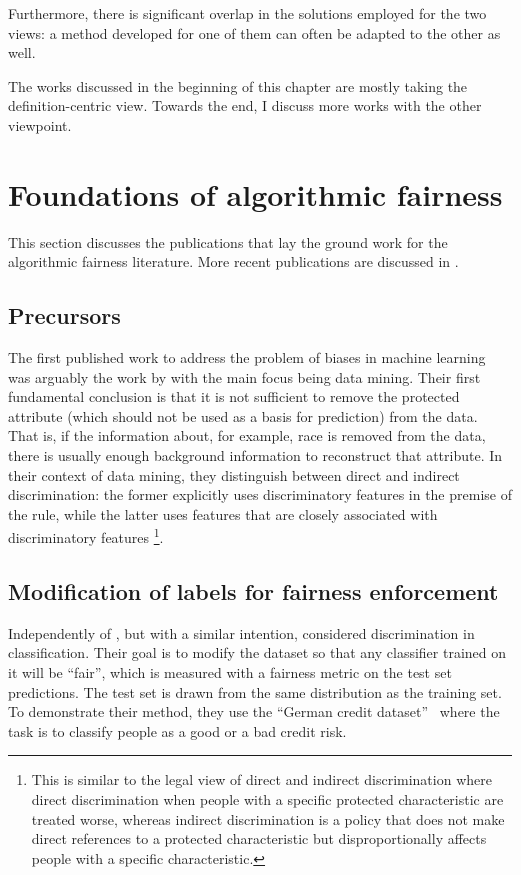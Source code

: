 Furthermore, there is significant overlap in the solutions employed for the two views:
a method developed for one of them can often be adapted to the other as well.

The works discussed in the beginning of this chapter are mostly taking the definition-centric view.
Towards the end, I discuss more works with the other viewpoint.

\section{Foundations of algorithmic fairness}\label{sec:foundations}
This section discusses the publications that lay the ground work for the algorithmic fairness literature.
More recent publications are discussed in .

\subsection{Precursors}\label{precursor}
The first published work to address the problem of biases in machine learning
was arguably the work by \citet{pedreshi2008discrimination}
with the main focus being data mining.
Their first fundamental conclusion
is that it is not sufficient to remove the protected attribute
(which should not be used as a basis for prediction) from the data.
That is, if the information about, for example, race
is removed from the data,
there is usually enough background information to reconstruct that attribute.
In their context of data mining,
they distinguish between direct and indirect discrimination:
the former explicitly uses discriminatory features in the premise of the rule,
while the latter uses features that are closely associated with discriminatory features%
\footnote{This is similar to the legal view of direct and indirect discrimination
where direct discrimination when people with a specific protected characteristic are treated worse,
whereas indirect discrimination is a policy that does not make direct references to a protected characteristic
but disproportionally affects people with a specific characteristic.}.

\subsection{Modification of labels for fairness enforcement}%
\label{modification-of-labels-for-fairness-enforcement}
Independently of \citet{pedreshi2008discrimination}, but with a similar intention,
\citet{kamiran2009classifying} considered discrimination in classification.
Their goal is to modify the dataset so that any classifier trained on it will be ``fair'',
which is measured with a fairness metric on the test set predictions.
The test set is drawn from the same distribution as the training set.
To demonstrate their method, they use the ``German credit dataset''~\citep{Dua:2017}
where the task is to classify people as a good or a bad credit risk.

